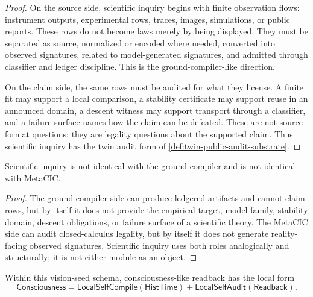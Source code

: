 \begin{proof}
On the source side, scientific inquiry begins with finite observation
flows: instrument outputs, experimental rows, traces, images, simulations,
or public reports. These rows do not become laws merely by being
displayed. They must be separated as source, normalized or encoded where
needed, converted into observed signatures, related to model-generated
signatures, and admitted through classifier and ledger discipline. This
is the ground-compiler-like direction.

On the claim side, the same rows must be audited for what they license.
A finite fit may support a local comparison, a stability certificate may
support reuse in an announced domain, a descent witness may support
transport through a classifier, and a failure surface names how the claim
can be defeated. These are not source-format questions; they are
legality questions about the supported claim. Thus scientific inquiry
has the twin audit form of \autoref{def:twin-public-audit-substrate}.
\end{proof}

\begin{corollary}
\label{cor:science-not-either-substrate-alone}
Scientific inquiry is not identical with the ground compiler and is not
identical with MetaCIC.
\end{corollary}

\begin{proof}
The ground compiler side can produce ledgered artifacts and cannot-claim
rows, but by itself it does not provide the empirical target, model
family, stability domain, descent obligations, or failure surface of a
scientific theory. The MetaCIC side can audit closed-calculus legality,
but by itself it does not generate reality-facing observed signatures.
Scientific inquiry uses both roles analogically and structurally; it is
not either module as an object.
\end{proof}

\begin{theorem}
\label{thm:consciousness-like-readback-local-twin-form}
Within this vision-seed schema, consciousness-like readback has the local
form
$$
\mathsf{Consciousness}
=
\mathsf{LocalSelfCompile}(\mathsf{HistTime})
+
\mathsf{LocalSelfAudit}(\mathsf{Readback}).
$$
\end{theorem}


